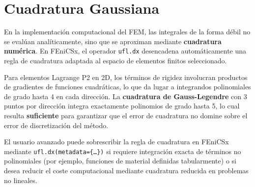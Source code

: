 \section{Cuadratura Gaussiana}

En la implementación computacional del FEM, las integrales de la forma débil no se evalúan analíticamente, sino que se aproximan mediante \textbf{cuadratura numérica}. En FEniCSx, el operador \texttt{ufl.dx} desencadena automáticamente una regla de cuadratura adaptada al espacio de elementos finitos seleccionado.

Para elementos Lagrange P2 en 2D, los términos de rigidez involucran productos de gradientes de funciones cuadráticas, lo que da lugar a integrandos polinomiales de grado hasta 4 en cada dirección. La \textbf{cuadratura de Gauss-Legendre} con 3 puntos por dirección integra exactamente polinomios de grado hasta 5, lo cual resulta \textbf{suficiente} para garantizar que el error de cuadratura no domine sobre el error de discretización del método.

\begin{notatecnica}
El usuario avanzado puede sobrescribir la regla de cuadratura en FEniCSx mediante \texttt{ufl.dx(metadata=\{\ldots\})} si requiere integración exacta de términos no polinomiales (por ejemplo, funciones de material definidas tabularmente) o si desea reducir el coste computacional mediante cuadratura reducida en problemas no lineales.
\end{notatecnica}
